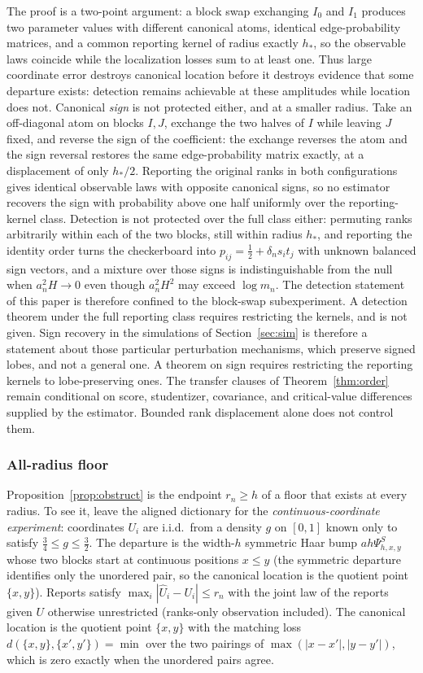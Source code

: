\documentclass[11pt]{article}
\theoremstyle{definition}
\newcommand{\1}{\mathbf 1}\newcommand{\op}{\operatorname}
\begin{document}
The proof is a two-point argument: a block swap exchanging $I_0$ and $I_1$
produces two parameter values with different canonical atoms, identical
edge-probability matrices, and a common reporting kernel of radius exactly $h_*$,
so the observable laws coincide while the localization losses sum to at least
one.  Thus large coordinate error destroys canonical location before it destroys
evidence that some departure exists: detection remains achievable at these
amplitudes while location does not.  Canonical \emph{sign} is not protected
either, and at a smaller radius.  Take an off-diagonal atom on blocks $I,J$,
exchange the two halves of $I$ while leaving $J$ fixed, and reverse the sign of
the coefficient: the exchange reverses the atom and the sign reversal restores
the same edge-probability matrix exactly, at a displacement of only $h_*/2$.
Reporting the original ranks in both configurations gives identical observable
laws with opposite canonical signs, so no estimator recovers the sign with
probability above one half uniformly over the reporting-kernel class.
Detection is not protected over the full class either: permuting ranks
arbitrarily within each of the two blocks, still within radius $h_*$, and
reporting the identity order turns the checkerboard into
$p_{ij}=\tfrac12+\delta_ns_it_j$ with unknown balanced sign vectors, and a
mixture over those signs is indistinguishable from the null when
$a_n^2H\to0$ even though $a_n^2H^2$ may exceed $\log m_n$.  The detection
statement of this paper is therefore confined to the block-swap
subexperiment.  A detection theorem under the full reporting class requires
restricting the kernels, and is not given.  Sign
recovery in the simulations of Section~\ref{sec:sim} is therefore a
statement about those particular perturbation mechanisms, which preserve signed
lobes, and not a general one.  A theorem on sign requires restricting the
reporting kernels to lobe-preserving ones.  The transfer clauses of
Theorem~\ref{thm:order} remain conditional on score, studentizer, covariance, and
critical-value differences supplied by the estimator.  Bounded rank displacement
alone does not control them.

\subsubsection{All-radius floor}

Proposition~\ref{prop:obstruct} is the endpoint $r_n\ge h$ of a floor that
exists at every radius.  To see it, leave the aligned dictionary for the
\emph{continuous-coordinate experiment}: coordinates $U_i$ are i.i.d.\ from a
density $g$ on $[0,1]$ known only to satisfy $\tfrac34\le g\le\tfrac32$.  The
departure is the width-$h$ symmetric Haar bump $a h\Psi^S_{h,x,y}$ whose two blocks start at continuous positions $x\le y$ (the symmetric departure identifies only the unordered pair, so the canonical location is the quotient point $\{x,y\}$).  Reports satisfy
$\max_i|\widehat U_i-U_i|\le r_n$ with the joint law of the reports given $U$
otherwise unrestricted (ranks-only observation included).  The canonical
location is the quotient point $\{x,y\}$ with the matching loss
$d(\{x,y\},\{x',y'\})=\min$ over the two pairings of
$\max(|x-x'|,|y-y'|)$, which is zero exactly when the unordered pairs agree.
\end{document}
